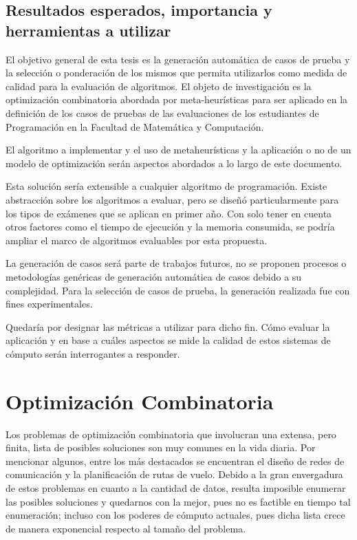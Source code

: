 \documentclass[a4paper,openright,11pt,oneside]{book}
\begin{document}
	\section{Resultados esperados, importancia y herramientas a utilizar}
	
		El objetivo general de esta tesis es la generación automática de casos de prueba y la selección o ponderación de los mismos que permita utilizarlos como medida de calidad para la evaluación de algoritmos.  El objeto de investigación es la optimización combinatoria \cite{baykasouglu2014testing} abordada por meta-heurísticas \cite{OptimizacionCombinatoria} para ser aplicado en la definición de los casos de pruebas de las evaluaciones de los estudiantes de Programación en la Facultad de Matemática y Computación.
		
		El algoritmo a implementar y el uso de metaheurísticas y la aplicación o no de un modelo de optimización serán aspectos abordados a lo largo de este documento.
		
		Esta solución sería extensible a cualquier algoritmo de programación. Existe abstracción sobre los algoritmos a evaluar, pero se diseñó particularmente para los tipos de exámenes que se aplican en primer año. Con solo tener en cuenta otros factores como el tiempo de ejecución y la memoria consumida, se podría ampliar el marco de algoritmos evaluables por esta propuesta.
		
		La generación de casos será parte de trabajos futuros, no se proponen procesos o metodologías genéricas de generación automática de casos debido a su complejidad. Para la selección de casos de prueba, la generación realizada fue con fines experimentales.
		
		Quedaría por designar las métricas a utilizar para dicho fin. Cómo evaluar la aplicación y en base a cuáles aspectos se mide la calidad de estos sistemas de cómputo serán interrogantes a responder.

\chapter{Optimización Combinatoria}
	Los problemas de optimización combinatoria que involucran una extensa, pero finita, lista de posibles soluciones son muy comunes en la vida diaria. Por mencionar algunos, entre los más destacados se encuentran el diseño de redes de comunicación y la planificación de rutas de vuelo. Debido a la gran envergadura de estos problemas en cuanto a la cantidad de datos, resulta imposible enumerar las posibles soluciones y quedarnos con la mejor, pues no es factible en tiempo tal enumeración; incluso con los poderes de cómputo actuales, pues dicha lista crece de manera exponencial respecto al tamaño del problema.
	
\end{document}
